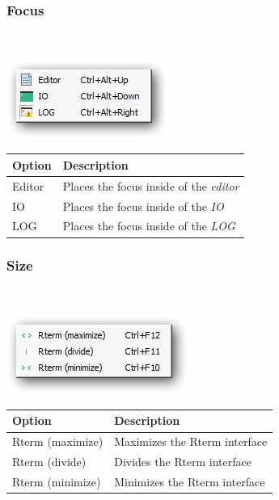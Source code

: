 \hypertarget{menu_r_rterm_focus}{}
\subsubsection{Focus}\\

\includegraphics[scale=0.50]{./res/menu_r_rterm_focus.png}\\

\begin{scriptsize}\begin{tabularx}{\textwidth}{>{\hsize=0.3\hsize}X>{\hsize=0.7\hsize}X}\\
    \hline
    \textbf{Option} & \textbf{Description} \\
    \hline
    Editor & Places the focus inside of the \textit{editor} \\
    IO & Places the focus inside of the \textit{IO} \\
    LOG & Places the focus inside of the \textit{LOG} \\
    \hline
  \end{tabularx}\end{scriptsize}


\hypertarget{menu_r_rterm_size}{}
\subsubsection{Size}\\

\includegraphics[scale=0.50]{./res/menu_r_rterm_size.png}\\

\begin{scriptsize}\begin{tabularx}{\textwidth}{>{\hsize=0.3\hsize}X>{\hsize=0.7\hsize}X}\\
    \hline
    \textbf{Option} & \textbf{Description} \\
    \hline
    Rterm (maximize) & Maximizes the Rterm interface \\
    Rterm (divide) & Divides the Rterm interface \\
    Rterm (minimize) & Minimizes the Rterm interface \\
    \hline
  \end{tabularx}\end{scriptsize}


